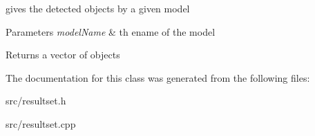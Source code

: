 gives the detected objects by a given model 


\begin{DoxyParams}{Parameters}
{\em model\+Name} & th ename of the model \\
\hline
\end{DoxyParams}
\begin{DoxyReturn}{Returns}
a vector of objects 
\end{DoxyReturn}


The documentation for this class was generated from the following files\+:\begin{DoxyCompactItemize}
\item 
src/resultset.\+h\item 
src/resultset.\+cpp\end{DoxyCompactItemize}
